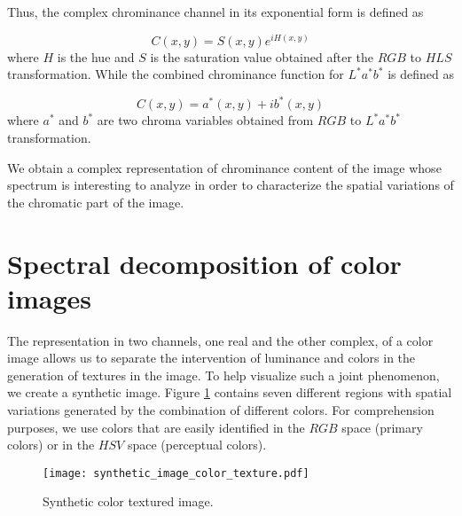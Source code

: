 Thus, the complex chrominance channel in its exponential form is defined as  

\begin{equation}\label{eq:chrominance_hsv}
    C(x,y) = S(x,y) e^{iH(x,y)}
\end{equation}
where $H$ is the hue and $S$ is the saturation value obtained after the $RGB$ to $HLS$ transformation. While the combined chrominance function for $L^*a^*b^*$ is defined as

\begin{equation}\label{eq:chrominance_lab}
    C(x,y) = a^*(x,y) + ib^*(x,y)
\end{equation}
where $a^*$ and $b^*$ are two chroma variables obtained from $RGB$ to $L^*a^*b^*$ transformation. 

We obtain a complex representation of chrominance content of the image whose spectrum is interesting to analyze in order to characterize the spatial variations of the chromatic part of the image. 

\section{Spectral decomposition of color images}

The representation in two channels, one real and the other complex, of a color image allows us to separate the intervention of luminance and colors in the generation of textures in the image. To help visualize such a joint phenomenon, we create a synthetic image. Figure \ref{fig:synthetic_color_texture_image} contains seven different regions with spatial variations generated by the combination of different colors. For comprehension purposes, we use colors that are easily identified in the $RGB$ space (primary colors) or in the $HSV$ space (perceptual colors).

\begin{figure}
    \texttt{[image: synthetic\_image\_color\_texture.pdf]}
\caption{Synthetic color textured image.}\label{fig:synthetic_color_texture_image}
\end{figure}

